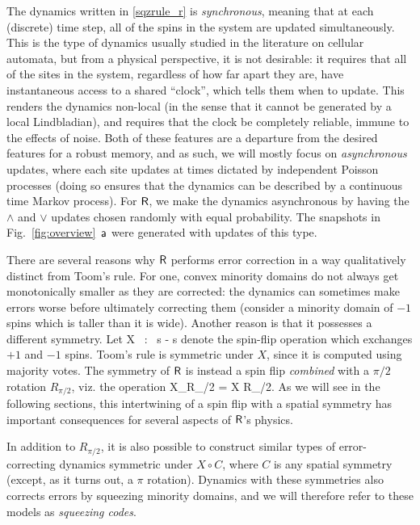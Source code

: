 \documentclass[pra,aps,twocolumn,groupedaddress,superscriptaddress,nofootinbib,preprintnumbers]{revtex4-2}
\begin{document}
	The dynamics written in \eqref{sqzrule_r} is {\it synchronous}, meaning that at each (discrete) time step, all of the spins in the system are updated simultaneously. This is the type of dynamics usually studied in the literature on cellular automata, but from a physical perspective, it is not desirable: it requires that all of the sites in the system, regardless of how far apart they are, have instantaneous access to a shared ``clock'', which tells them when to update. This renders the dynamics non-local (in the sense that it cannot be generated by a local Lindbladian), and requires that the clock be completely reliable, immune to the effects of noise. Both of these features are a departure from the desired features for a robust memory, and as such, we will mostly focus on {\it asynchronous} updates, where each site updates at times dictated by independent Poisson processes (doing so ensures that the dynamics can be described by a continuous time Markov process). For $\mathsf{R}$, we make the dynamics asynchronous by having the $\wedge$ and $\vee$ updates chosen randomly with equal probability. The snapshots in Fig.~\ref{fig:overview}~$\mathsf{a}$ were generated with updates of this type. 
	
	There are several reasons why $\mathsf{R}$ performs error correction in a way qualitatively distinct from Toom's rule. For one, convex minority domains do not always get monotonically smaller as they are corrected: the dynamics can sometimes make errors worse before ultimately correcting them (consider a minority domain of $-1$ spins which is taller than it is wide). Another reason is that it possesses a different symmetry. Let 
	\be \label{xdef} X \, : \, s \mt - s \ee 
	denote the spin-flip operation which exchanges $+1$ and $-1$ spins. Toom's rule is symmetric under $X$, since it is computed using majority votes. The symmetry of $\mathsf{R}$ is instead a spin flip {\it combined} with a $\pi/2$ rotation $R_{\pi/2}$, viz. the operation 
	\be \label{mixsym} X_{R_{\pi/2}} = X \circ R_{\pi/2}.\ee 
	As we will see in the following sections, this intertwining of a spin flip with a spatial symmetry has important consequences for several aspects of $\mathsf{R}$'s physics. 
	
	In addition to $R_{\pi/2}$, it is also possible to construct similar types of error-correcting dynamics symmetric under $X \circ C$, where $C$ is any spatial symmetry (except, as it turns out, a $\pi$ rotation).  Dynamics with these symmetries also corrects errors by squeezing minority domains, and we will therefore refer to these models as {\it squeezing codes}. 
	
\end{document}
